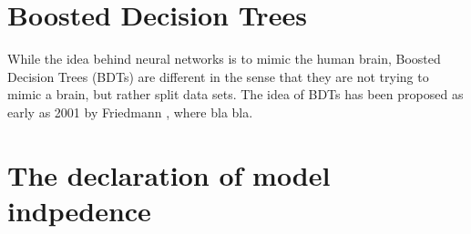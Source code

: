 \documentclass[14pt, a4paper]{book}
\begin{document}
\clearpage




\section{Boosted Decision Trees}
While the idea behind neural networks is to mimic the human brain, Boosted Decision Trees (BDTs) are different in the sense that they are not trying to mimic a brain, but rather split data sets. The idea of BDTs has been proposed as early as 2001 by Friedmann \cite{BDT_Friedman}, 
where bla bla.


\section{The declaration of model indpedence}
\end{document}
